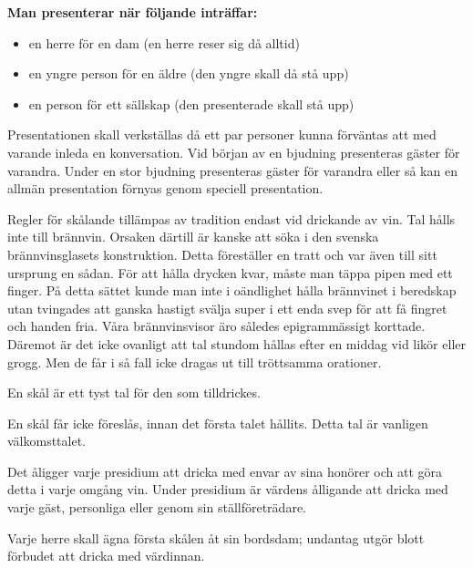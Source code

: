 \pagestyle{Hyfs och Etikett}


\textbf{Man presenterar när följande inträffar:}

\begin{itemize}
    \item en herre för en dam (en herre reser sig då alltid)
    \item en yngre person för en äldre (den yngre skall då stå upp)
    \item en person för ett sällskap (den presenterade skall stå upp)
\end{itemize}

Presentationen skall verkställas då ett par personer kunna förväntas att med varande inleda en konversation. Vid början av en bjudning presenteras gäster för varandra. Under en stor bjudning presenteras gäster för varandra eller så kan en allmän presentation förnyas genom speciell presentation.


Regler för skålande tillämpas av tradition endast vid drickande av vin. Tal hålls inte till brännvin. Orsaken därtill är kanske att söka i den svenska brännvinsglasets konstruktion. Detta föreställer en tratt och var även till sitt ursprung en sådan. För att hålla drycken kvar, måste man täppa pipen med ett finger. På detta sättet kunde man inte i oändlighet hålla brännvinet i beredskap utan tvingades att ganska hastigt svälja super i ett enda svep för att få fingret och handen fria. Våra brännvinsvisor äro således epigrammässigt korttade. Däremot är det icke ovanligt att tal stundom hållas efter en middag vid likör eller grogg. Men de får i så fall icke dragas ut till tröttsamma orationer.

En skål är ett tyst tal för den som tilldrickes.

En skål får icke föreslås, innan det första talet hållits. Detta tal är vanligen välkomsttalet.

Det åligger varje presidium att dricka med envar av sina honörer och att göra detta i varje omgång vin. Under presidium är värdens ålligande att dricka med varje gäst, personliga eller genom sin ställföreträdare.

Varje herre skall ägna första skålen åt sin bordsdam; undantag utgör blott förbudet att dricka med värdinnan.

